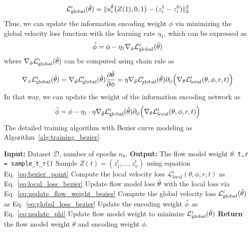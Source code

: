 \documentclass{article}
\begin{document}
\begin{equation}
    \mathcal{L}^{i}_{\text{global}}(\Tilde{\theta}) = \|u^{\Tilde{\theta}}_i\big(Z(1), 0,1 \big) - (z^1_i - z^0_i)\|^2_2 \label{eq:global_loss_bezier}
\end{equation}
Thus, we can update the information encoding weight $\phi$ via minimizing the global velocity loss function with the learning rate $\eta_1$, which can be expressed as
\begin{equation}
    \Tilde{\phi} = \phi - \eta_1 \nabla_{\phi} \mathcal{L}^{i}_{\text{global}}(\Tilde{\theta})
\end{equation}
where $\nabla_{\phi}\mathcal{L}^{i}_{\text{global}}(\Tilde{\theta})$ can be computed using chain rule as 
\begin{equation}
    \nabla_{\phi} \mathcal{L}^{i}_{\text{global}}(\Tilde{\theta}) = \nabla_{\Tilde{\theta}} \mathcal{L}^{i}_{\text{global}}(\Tilde{\theta}) \frac{\partial \Tilde{\theta}}{\partial \phi} = \eta \nabla_{\Tilde{\theta}} \mathcal{L}^{i}_{\text{global}}(\Tilde{\theta}) \partial_{\phi} \Big(\nabla_{\theta} \mathcal{L}^{i}_{\text{local}}(\theta, \phi, r,t) \Big)
\end{equation}
In that way, we can update the weight of the information encoding network as 
\begin{equation}
    \Tilde{\phi} = \phi - \eta_1\cdot \eta \nabla_{\Tilde{\theta}} \mathcal{L}^{i}_{\text{global}}(\Tilde{\theta}) \partial_{\phi} \Big(\nabla_{\theta} \mathcal{L}^{i}_{\text{local}}(\theta, \phi, r,t) \Big) \label{eq:update_phi}
\end{equation}
The detailed training algorithm with Bezier curve modeling as Algorithm~\ref {alg:training_bezier}

\begin{algorithm}
\caption{Training Algorithm with Bezier curve modeling}
\label{alg:training_bezier}
\begin{algorithmic}[1]
\STATE \textbf{Input:} Dataset $\mathcal{D}$, number of epochs $n_0$.
\STATE \textbf{Output:} The flow model weight $\theta$.
    \STATE  \texttt{t,r = sample\_t\_r()}
    \STATE Sample $Z(t) = (z^t_1,...,z^t_n)$ using equation Eq.~\ref{eq:bezier_point} 
    \STATE Compute the local velocity loss $\mathcal{L}^{i}_{\text{local}}(\theta, \phi, r, t)$ as Eq.~\ref{eq:local_loss_bezier}
    \STATE Update flow model loss $\Tilde{\theta}$ with the local loss via Eq.~\ref{eq:update_flow_weight_bezier}
    \STATE Compute the global velocity loss $\mathcal{L}^{i}_{\text{global}}(\Tilde{\theta})$ as Eq.~\ref{eq:global_loss_bezier}
    \STATE Update the encoding weight $\Tilde{\phi}$ as Eq.~\ref{eq:update_phi} 
    \STATE Update flow model weight to minimize $\mathcal{L}^{i}_{\text{global}}(\Tilde{\theta})$
\ENDFOR
\STATE \textbf{Return} the flow model weight $\theta$ and encoding weight $\phi$.
\end{algorithmic}
\end{algorithm}
\end{document}
